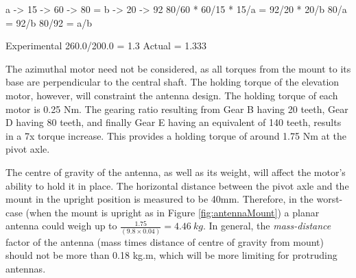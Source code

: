 a -> 15 -> 60 -> 80        =      b -> 20 -> 92
80/60 * 60/15 * 15/a       = 92/20 * 20/b
80/a                       = 92/b
80/92 = a/b




Experimental 260.0/200.0 = 1.3
Actual = 1.333

The azimuthal motor need not be considered, as all torques from the mount to its base are perpendicular to the central shaft. The holding torque of the elevation motor, however, will constraint the antenna design. The holding torque of each motor is 0.25 Nm. The gearing ratio resulting from Gear B having 20 teeth, Gear D having 80 teeth, and finally Gear E having an equivalent of 140 teeth, results in a 7x torque increase. This provides a holding torque of around 1.75 Nm at the pivot axle.

The centre of gravity of the antenna, as well as its weight, will affect the motor's ability to hold it in place. The horizontal distance between the pivot axle and the mount in the upright position is measured to be 40mm. Therefore, in the worst-case (when the mount is upright as in Figure \ref{fig:antennaMount}) a planar antenna could weigh up to $\frac{1.75}{(9.8 \times 0.04)} = \SI{4.46}{kg}$. In general, the \textit{mass-distance} factor of the antenna (mass times distance of centre of gravity from mount) should not be more than 0.18 kg.m, which will be more limiting for protruding antennas.